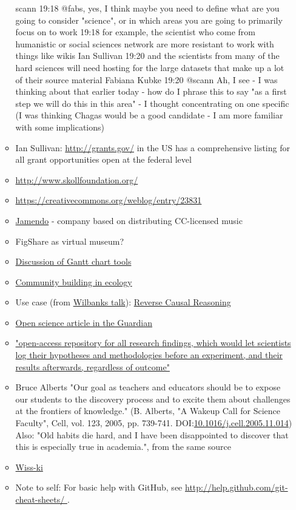 \documentclass[final,authoryear,3p]{elsarticle-open-drafting}
\begin{document}
\begin{enumerate}
\begin{itemize}
scann 19:18 
@fabs, yes, I think maybe you need to define what are you going to consider "science", or in which areas you are going to primarily focus on to work
19:18
for example, the scientist who come from humanistic or social sciences network are more resistant to work with things like wikis
Ian Sullivan 19:20 
and the scientists from many of the hard sciences will need hosting for the large datasets that make up a lot of their source material
Fabiana Kubke 19:20 
@scann Ah, I see - I was thinking about that earlier today - how do I phrase this to say "as a first step we will do this in this area" - I thought concentrating on one specific (I was thinking Chagas would be a good candidate - I am more familiar with some implications)
	\item Ian Sullivan: \href{http://grants.gov/}{http://grants.gov/}  in the US has a comprehensive listing for all grant opportunities open at the federal level
	\item \href{http://www.skollfoundation.org/}{http://www.skollfoundation.org/}
	\item \href{https://creativecommons.org/weblog/entry/23831}{https://creativecommons.org/weblog/entry/23831}
	\item \href{http://www.jamendo.com/en/creativecommons}{Jamendo} - company based on distributing CC-licensed music
	\item FigShare as virtual museum?
	\item \href{http://ff.im/D6rQ0}{Discussion of Gantt chart tools}
	\item \href{http://dx.doi.org/10.1038/npre.2010.4603.1}{Community building in ecology}
	\item Use case (from \href{}{Wilbanks talk}): \href{http://selventa.com/technology/white-papers}{Reverse Causal Reasoning}
	\item \href{http://www.guardian.co.uk/education/2011/may/22/open-science-shared-research-internet}{Open science article in the Guardian}
	\item \href{http://www.nature.com/news/2011/110223/full/470437a.html}{"open-access repository for all research findings, which would let scientists log their hypotheses and methodologies before an experiment, and their results afterwards, regardless of outcome"}
	\item Bruce Alberts "Our goal as teachers and educators should be to expose our students to the discovery process and to excite them about challenges at the frontiers of knowledge." (B. Alberts, "A Wakeup Call for Science Faculty", Cell, vol. 123, 2005, pp. 739-741. DOI:\href{http://dx.doi.org/10.1016/j.cell.2005.11.014}{10.1016/j.cell.2005.11.014})
	Also: "Old habits die hard, and I have been disappointed to discover that this is especially true in academia.", from the same source
	\item \href{http://wiss-ki.eu/}{Wiss-ki}
	\item Note to self: For basic help with GitHub, see \href{http://help.github.com/git-cheat-sheets/}{http://help.github.com/git-cheat-sheets/ } .
\end{itemize}


\end{enumerate}
\end{document}
